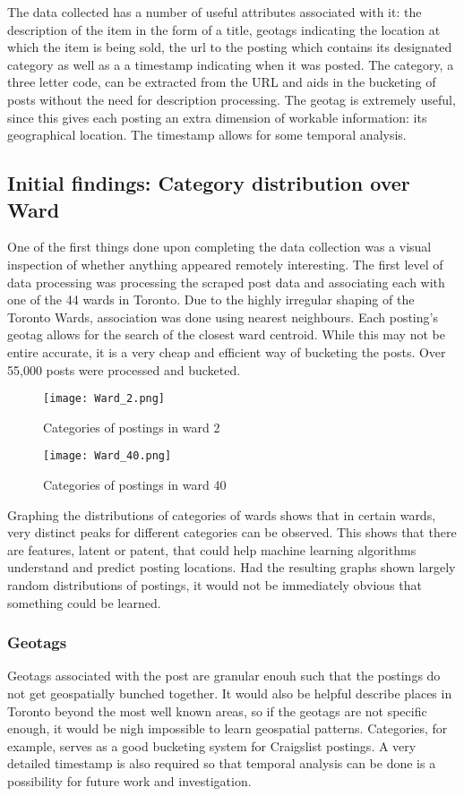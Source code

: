 \documentclass[12pt]{article}
\begin{document}
The data collected has a number of useful attributes associated with it: the description of the item in the form of a title, geotags indicating the location at which the item is being sold, the url to the posting which contains its designated category as well as a a timestamp indicating when it was posted. The category, a three letter code, can be extracted from the URL and aids in the bucketing of posts without the need for description processing. The geotag is extremely useful, since this gives each posting an extra dimension of workable information: its geographical location. The timestamp allows for some temporal analysis. 

\subsection{Initial findings: Category distribution over Ward}
One of the first things done upon completing the data collection was a visual inspection of whether anything appeared remotely interesting. The first level of data processing was processing the scraped post data and associating each with one of the 44 wards in Toronto. Due to the highly irregular shaping of the Toronto Wards, association was done using nearest neighbours. Each posting's geotag allows for the search of the closest ward centroid. While this may not be entire accurate, it is a very cheap and efficient way of bucketing the posts. Over 55,000 posts were processed and bucketed.

\begin{figure}[h]
\centering
\texttt{[image: Ward\_2.png]}
\caption{Categories of postings in ward 2}
\end{figure}

\begin{figure}[h]
\centering
\texttt{[image: Ward\_40.png]}
\caption{Categories of postings in ward 40}
\end{figure}

Graphing the distributions of categories of wards shows that in certain wards, very distinct peaks for different categories can be observed. This shows that there are features, latent or patent, that could help machine learning algorithms understand and predict posting locations. Had the resulting graphs shown largely random distributions of postings, it would not be immediately obvious that something could be learned. 

\subsubsection{Geotags} %
Geotags associated with the post are granular enouh such that the postings do not get geospatially bunched together. It would also be helpful describe places in Toronto beyond the most well known areas, so if the geotags are not specific enough, it would be nigh impossible to learn geospatial patterns. Categories, for example, serves as a good bucketing system for Craigslist postings. A very detailed timestamp is also required so that temporal analysis can be done is a possibility for future work and investigation.
\end{document}
